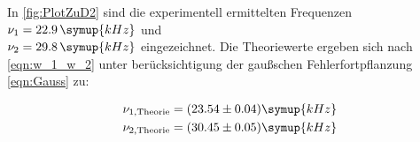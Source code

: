 In \autoref{fig:PlotZuD2} sind die experimentell ermittelten Frequenzen $\nu_1 = 22.9 \, \symup{kHz}$ und \\ $\nu_2 = 29.8 \, \symup{kHz}$ eingezeichnet.
Die Theoriewerte ergeben sich nach \eqref{eqn:w_1_w_2} unter berücksichtigung der gaußschen Fehlerfortpflanzung \eqref{eqn:Gauss} zu:

\begin{align*}
  \nu_{1,\text{Theorie}} &= (23.54 \pm 0.04) \symup{kHz} \\
  \nu_{2,\text{Theorie}} &= (30.45 \pm 0.05) \symup{kHz}
\end{align*}

\cite{uncertainties}

